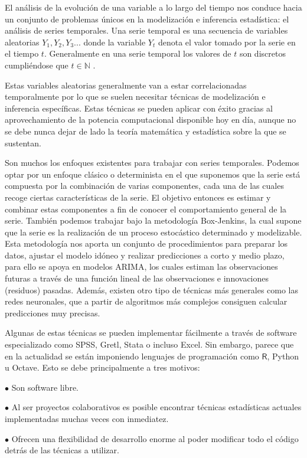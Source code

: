 
El análisis de la evolución de una variable a lo largo del tiempo nos conduce hacia un conjunto de problemas únicos en la modelización e inferencia estadística: el análisis de series temporales. Una serie temporal es una secuencia de variables aleatorias $Y_1,Y_2,Y_3...$ donde la variable $Y_t$ denota el valor tomado por la serie en el tiempo $t$. Generalmente en una serie temporal los valores de $t$ son discretos cumpliéndose que $t \in \mathbb{N}$ \cite{chatfield2016analysis}.

Estas variables aleatorias generalmente van a estar correlacionadas temporalmente por lo que se suelen necesitar técnicas de modelización e inferencia específicas. Estas técnicas se pueden aplicar con éxito gracias al aprovechamiento de la potencia computacional disponible hoy en día, aunque no se debe nunca dejar de lado la teoría matemática y estadística sobre la que se sustentan.

Son muchos los enfoques existentes para trabajar con series temporales. Podemos optar por un enfoque clásico o determinista en el que suponemos  que la serie está compuesta por la combinación de varias componentes, cada una de las cuales recoge ciertas características de la serie. El objetivo entonces es estimar y combinar estas componentes a fin de conocer el comportamiento general de la serie. También podemos trabajar bajo la metodología Box-Jenkins, la cual supone que la serie es la realización de un proceso estocástico determinado y modelizable. Esta metodología nos aporta un conjunto de procedimientos para preparar los datos, ajustar el modelo idóneo y realizar predicciones a corto y medio plazo, para ello se apoya en modelos ARIMA, los cuales estiman las observaciones futuras a través de una función lineal de las observaciones e innovaciones (residuos) pasadas. Además, existen otro tipo de técnicas más generales como las redes neuronales, que a partir de algoritmos más complejos consiguen calcular predicciones muy precisas.

Algunas de estas técnicas se pueden implementar fácilmente a través de software especializado como SPSS, Gretl, Stata o incluso Excel. Sin embargo, parece que en la actualidad se están imponiendo lenguajes de programación como $\textsf{R}$, Python u Octave. Esto se debe principalmente a tres motivos:

\begin{itemize*}
  \item[$\bullet$]Son software libre.
  \item[$\bullet$]Al ser proyectos colaborativos es posible encontrar técnicas estadísticas actuales implementadas muchas veces con inmediatez.
  \item[$\bullet$]Ofrecen una flexibilidad de desarrollo enorme al poder modificar todo el código detrás de las técnicas a utilizar.
\end{itemize*}


